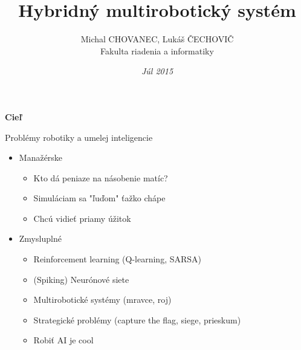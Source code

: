 \documentclass[xcolor=dvipsnames]{beamer}
\title{\bf Hybridný multirobotický systém}
\author{Michal CHOVANEC, Lukáš ČECHOVIČ \\Fakulta riadenia a informatiky}
\date[EURP]{\it Júl 2015}
\begin{document}
\begin{frame}
\titlepage
\end{frame}

\begin{frame}{\bf Cieľ}

Problémy robotiky a umelej inteligencie

\begin{itemize}
	\item Manažérske
        \begin{itemize}
        \item Kto dá peniaze na násobenie matíc?
        \item Simuláciam sa "ľuďom" ťažko chápe
        \item Chcú vidieť priamy úžitok
        \end{itemize}

	\item Zmysluplné
        \begin{itemize}
        \item Reinforcement learning (Q-learning, SARSA)
        \item (Spiking) Neurónové siete
        \item Multirobotické systémy (mravce, roj)
        \item Strategické problémy (capture the flag, siege, prieskum)
        \item Robiť AI je cool
        \end{itemize}
\end{itemize}

\end{frame}
\end{document}
